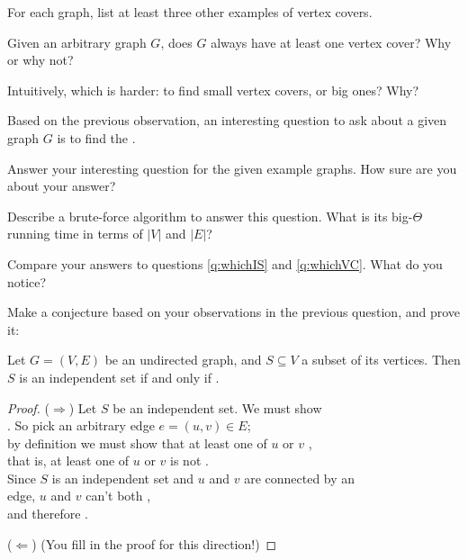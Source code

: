 \documentclass{tufte-handout}
\begin{document}
\begin{questions}
\item For each graph, list at least three other examples of
  vertex covers.

\item Given an arbitrary graph $G$, does $G$ always have at least one
  vertex cover?  Why or why not?

\item Intuitively, which is harder: to find small vertex covers, or
  big ones?  Why?

\item Based on the previous observation, an interesting question to
  ask about a given graph $G$ is to find the \blank.

\item Answer your interesting question for the given example graphs.
  How sure are you about your answer?

\item Describe a brute-force algorithm to answer this question.  What
  is its big-$\Theta$ running time in terms of $|V|$ and $|E|$?

\item Compare your answers to questions \ref{q:whichIS} and
  \ref{q:whichVC}.  What do you notice?
\end{questions}

Make a conjecture based on your observations in the previous question,
and prove it:

\begin{thm}
  Let $G = (V,E)$ be an undirected graph, and $S \subseteq V$ a subset
  of its vertices.  Then $S$ is an independent set if and only if \blank.
\end{thm}

\begin{proof}
  ($\Longrightarrow$) Let $S$ be an independent set.  We must show \\
  \blank. So pick an arbitrary edge $e = (u,v) \in E$; \\ by
  definition we must show that at least one of $u$ or $v$ \blank, \\
  that is, at least one of $u$ or $v$ is not \blank. \\
  Since $S$ is an independent set and $u$ and $v$ are connected by an \\
  edge, $u$ and $v$ can't both \blank, \\
  and therefore \blank. \medskip

  ($\Longleftarrow$) (You fill in the proof for this direction!)
\end{proof}
\end{document}
